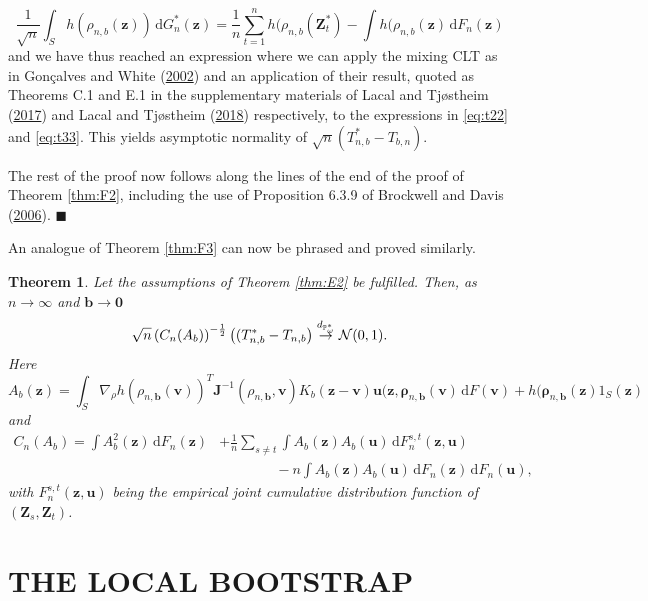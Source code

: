 \documentclass[
  12pt,
  letterpaper]{article}
\newtheorem{thm}{Theorem}[section]
\numberwithin{equation}{section}
\newcommand{\Z}{\bm{Z}}
\newcommand{\z}{\bm{z}}
\newcommand{\fv}{\bm{v}}
\newcommand{\fu}{\bm{u}}
\newcommand{\J}{\bm{J}}
\newcommand{\frho}{\bm{\rho}}
\newcommand{\bb}{\bm{b}}
\newcommand{\di}{\,\textrm{d}}
\begin{document}
\begin{equation}
\frac{1}{\sqrt{n}} \int_S h(\rho_{n,b}(\z)) \di G_n^*(\z) = \frac{1}{n}\sum_{t=1}^{n}h(\rho_{n,b}(\Z_t^{*}) - \int h(\rho_{n,b}(\z) \di F_n(\z)
\label{eq:t33}
\end{equation}
and we have thus reached an expression where we can apply the mixing CLT as in Gonçalves and White (\protect\hyperlink{ref-gonccalves2002bootstrap}{2002}) and an application of their result, quoted as Theorems C.1 and E.1 in the supplementary materials of Lacal and Tjøstheim (\protect\hyperlink{ref-lacal2017local}{2017}) and Lacal and Tjøstheim (\protect\hyperlink{ref-lacal2018estimating}{2018}) respectively, to the expressions in \eqref{eq:t22} and \eqref{eq:t33}. This yields asymptotic normality of \(\sqrt{n}(T_{n,b}^*-T_{b,n})\).

The rest of the proof now follows along the lines of the end of the proof of Theorem \ref{thm:F2}, including the use of Proposition 6.3.9 of Brockwell and Davis (\protect\hyperlink{ref-brockwell1991time}{2006}). \(\blacksquare\)

An analogue of Theorem \ref{thm:F3} can now be phrased and proved similarly.

\begin{thm}
Let the assumptions of Theorem \ref{thm:E2} be fulfilled. Then,
as $n \to \infty$ and $\bb \to \bm{0}$
$$
\sqrt{n}\left(C_{n}(A_b)\right)^{-\frac{1}{2}}\left((T_{n,b}^* - T_{n,b}\right) \buildrel {d_{\mathbb{P}_{\omega}^*}} \over {\to} {\cal N}(0,1).
$$
Here 
$$
A_b(\z) = \int_S \nabla_{\rho}h(\rho_{n,\bb}(\fv))^{T}{\J}^{-1}(\rho_{n,\bb},\fv)K_b(\z-\fv)\fu(\z,\frho_{n,\bb}(\fv) \di F(\fv) + h(\frho_{n,\bb}(\z)1_S(\z)
$$
and 
\begin{align*}
C_n(A_b) = \int A_b^2(\z) \di F_n(\z) &+ \frac{1}{n}\sum_{s \neq t}\int A_b(\z)A_b(\fu) \di F_n^{s,t}(\z,\fu) \\ & \qquad\qquad- n\int A_b(\z)A_b(\fu)\di F_n(\z) \di F_n(\fu),
\end{align*}
with $F_n^{s,t}(\z,\fu)$ being the empirical joint cumulative distribution function of $(\Z_s,\Z_t)$.
\label{thm:H2}
\end{thm}

\hypertarget{the-local-bootstrap}{%
\section{THE LOCAL BOOTSTRAP}\label{the-local-bootstrap}}
\end{document}
